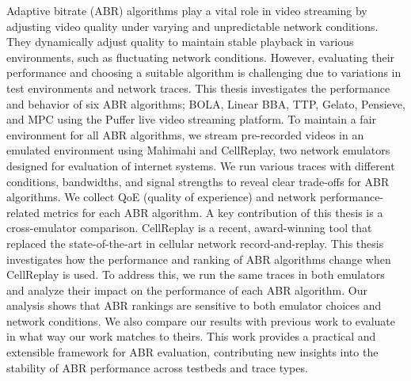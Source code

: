 %
Adaptive bitrate (ABR) algorithms play a vital role in video streaming by adjusting video quality under varying and unpredictable network conditions. They dynamically adjust quality to maintain stable playback in various environments, such as fluctuating network conditions. However, evaluating their performance and choosing a suitable algorithm is challenging due to variations in test environments and network traces. This thesis investigates the performance and behavior of six ABR algorithms; BOLA, Linear BBA, TTP, Gelato, Pensieve, and MPC using the Puffer live video streaming platform. To maintain a fair environment for all ABR algorithms, we stream pre-recorded videos in an emulated environment using Mahimahi and CellReplay, two network emulators designed for evaluation of internet systems. We run various traces with different conditions, bandwidths, and signal strengths to reveal clear trade-offs for ABR algorithms. We collect QoE (quality of experience) and network performance-related metrics for each ABR algorithm. A key contribution of this thesis is a cross-emulator comparison. CellReplay is a recent, award-winning tool that replaced the state-of-the-art in cellular network record-and-replay. This thesis investigates how the performance and ranking of ABR algorithms change when CellReplay is used. To address this, we run the same traces in both emulators and analyze their impact on the performance of each ABR algorithm. Our analysis shows that ABR rankings are sensitive to both emulator choices and network conditions. We also compare our results with previous work to evaluate in what way our work matches to theirs. This work provides a practical and extensible framework for ABR evaluation, contributing new insights into the stability of ABR performance across testbeds and trace types.


